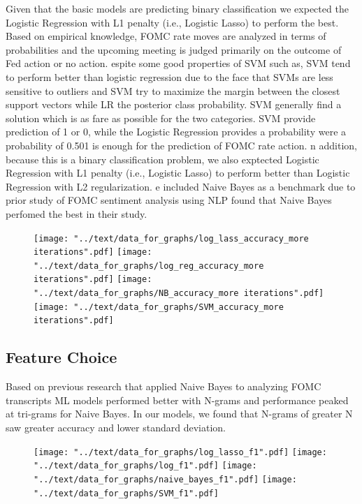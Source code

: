\documentclass[11pt]{article}
\newcommand{\vertSpace}[1]{\vspace{3mm}}
\begin{document}
Given that the basic models are predicting binary classification we expected the Logistic Regression with L1 penalty (i.e., Logistic Lasso) to perform the best.  Based on empirical knowledge, FOMC rate moves are analyzed in terms of probabilities and the upcoming meeting is judged primarily on the outcome of Fed action or no action.  \vertSpace


Despite some good properties of SVM such as, SVM tend to perform better than logistic regression due to the face that SVMs are less sensitive to outliers and SVM try to maximize the margin between the closest support vectors while LR the posterior class probability. SVM generally find a solution which is as fare as possible for the two categories.  SVM provide prediction of 1 or 0, while the Logistic Regression provides a probability were a probability of 0.501 is enough for the prediction of FOMC rate action.  \vertSpace


In addition, because this is a binary classification problem, we also exptected Logistic Regression with L1 penalty (i.e., Logistic Lasso) to perform better than Logistic Regression with L2 regularization.  \vertSpace 


We included Naive Bayes as a benchmark due to prior study of FOMC sentiment analysis using NLP found that Naive Bayes perfomed the best in their study. 

\begin{figure}[h!]
\begin{center}
\texttt{[image: "../text/data\_for\_graphs/log\_lass\_accuracy\_more iterations".pdf]}
\texttt{[image: "../text/data\_for\_graphs/log\_reg\_accuracy\_more iterations".pdf]}
\texttt{[image: "../text/data\_for\_graphs/NB\_accuracy\_more iterations".pdf]}
\texttt{[image: "../text/data\_for\_graphs/SVM\_accuracy\_more iterations".pdf]}
\end{center}
\end{figure}


\subsection{Feature Choice}

Based on previous research that applied Naive Bayes to analyzing FOMC transcripts \cite{stanford} ML models performed better with N-grams and performance peaked at tri-grams for Naive Bayes.  In our models, we found that N-grams of greater N saw greater accuracy and lower standard deviation.  


\begin{figure}[h!]
\begin{center}
\texttt{[image: "../text/data\_for\_graphs/log\_lasso\_f1".pdf]}
\texttt{[image: "../text/data\_for\_graphs/log\_f1".pdf]}
\texttt{[image: "../text/data\_for\_graphs/naive\_bayes\_f1".pdf]}
\texttt{[image: "../text/data\_for\_graphs/SVM\_f1".pdf]}
\end{center}
\end{figure}
\end{document}
